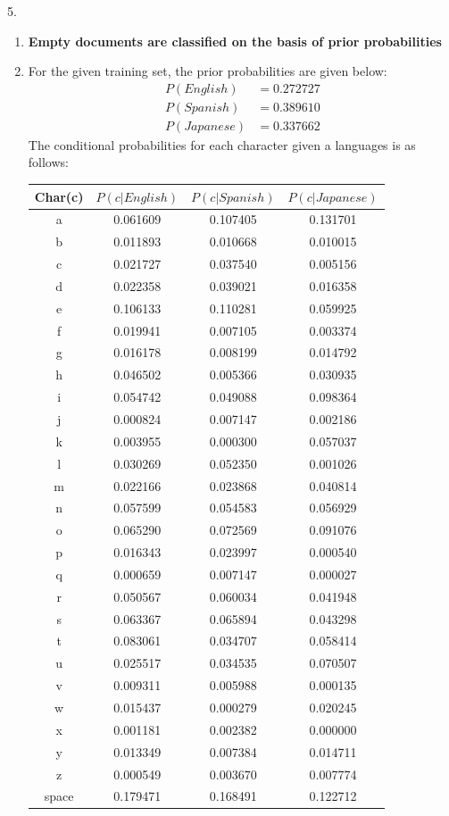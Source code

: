 \documentclass[11pt]{article}
\begin{document}
5.
	\begin{enumerate}
	\item \textbf{Empty documents are classified on the basis of prior probabilities}
	\item For the given training set, the prior probabilities are given below:
	\begin{align*}
	P(English)  &= 0.272727 \\
	P(Spanish)  &= 0.389610 \\
	P(Japanese) &= 0.337662
	\end{align*}
	The conditional probabilities for each character given a languages is as follows:

	\begin{tabular}{|c|c|c|c|}
		\hline
			Char(c)	&$P(c|English)$&$P(c|Spanish)$&$P(c|Japanese)$\\
		\hline	
			a				&0.061609			&0.107405			&0.131701			\\
			b				&0.011893			&0.010668			&0.010015			\\
			c				&0.021727			&0.037540			&0.005156			\\
			d				&0.022358			&0.039021			&0.016358			\\
			e				&0.106133			&0.110281			&0.059925			\\
			f				&0.019941			&0.007105			&0.003374			\\
			g				&0.016178			&0.008199			&0.014792			\\
			h				&0.046502			&0.005366			&0.030935			\\
			i				&0.054742			&0.049088			&0.098364			\\
			j				&0.000824			&0.007147			&0.002186			\\
			k				&0.003955			&0.000300			&0.057037			\\
			l				&0.030269			&0.052350			&0.001026			\\
			m				&0.022166			&0.023868			&0.040814			\\
			n				&0.057599			&0.054583			&0.056929			\\
			o				&0.065290			&0.072569			&0.091076			\\
			p				&0.016343			&0.023997			&0.000540			\\
			q				&0.000659			&0.007147			&0.000027			\\
			r				&0.050567			&0.060034			&0.041948			\\
			s				&0.063367			&0.065894			&0.043298			\\
			t				&0.083061			&0.034707			&0.058414			\\
			u				&0.025517			&0.034535			&0.070507			\\
			v				&0.009311			&0.005988			&0.000135			\\
			w				&0.015437			&0.000279			&0.020245			\\
			x				&0.001181			&0.002382			&0.000000			\\
			y				&0.013349			&0.007384			&0.014711			\\
			z				&0.000549			&0.003670			&0.007774			\\
			space	  &0.179471			&0.168491			&0.122712			\\
		\hline
	\end{tabular}
	

\end{enumerate}
\end{document}
